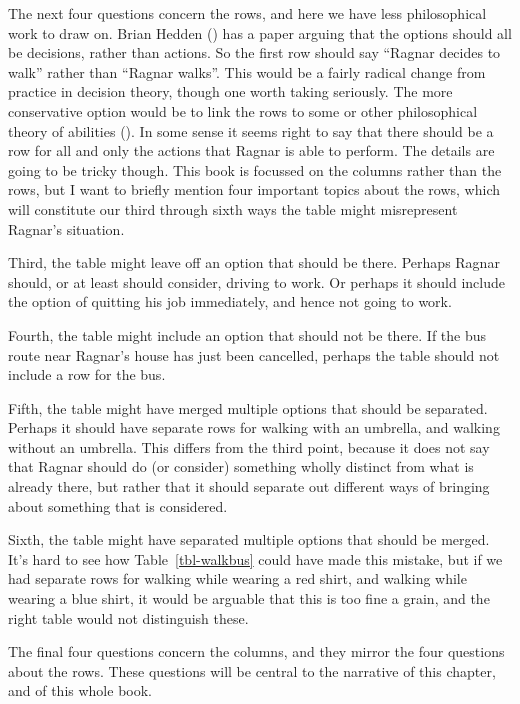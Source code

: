 \documentclass[
  10pt,
  letterpaper,
  twoside]{scrbook}
\begin{document}
The next four questions concern the rows, and here we have less
philosophical work to draw on. Brian Hedden
() has a paper arguing that the options
should all be decisions, rather than actions. So the first row should
say ``Ragnar decides to walk'' rather than ``Ragnar walks''. This would
be a fairly radical change from practice in decision theory, though one
worth taking seriously. The more conservative option would be to link
the rows to some or other philosophical theory of abilities
(). In some sense it seems
right to say that there should be a row for all and only the actions
that Ragnar is able to perform. The details are going to be tricky
though. This book is focussed on the columns rather than the rows, but I
want to briefly mention four important topics about the rows, which will
constitute our third through sixth ways the table might misrepresent
Ragnar's situation.

Third, the table might leave off an option that should be there. Perhaps
Ragnar should, or at least should consider, driving to work. Or perhaps
it should include the option of quitting his job immediately, and hence
not going to work.

Fourth, the table might include an option that should not be there. If
the bus route near Ragnar's house has just been cancelled, perhaps the
table should not include a row for the bus.

Fifth, the table might have merged multiple options that should be
separated. Perhaps it should have separate rows for walking with an
umbrella, and walking without an umbrella. This differs from the third
point, because it does not say that Ragnar should do (or consider)
something wholly distinct from what is already there, but rather that it
should separate out different ways of bringing about something that is
considered.

Sixth, the table might have separated multiple options that should be
merged. It's hard to see how Table~\ref{tbl-walkbus} could have made
this mistake, but if we had separate rows for walking while wearing a
red shirt, and walking while wearing a blue shirt, it would be arguable
that this is too fine a grain, and the right table would not distinguish
these.

The final four questions concern the columns, and they mirror the four
questions about the rows. These questions will be central to the
narrative of this chapter, and of this whole book.
\end{document}

